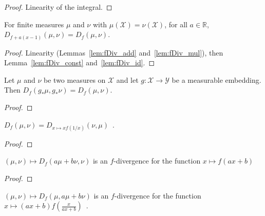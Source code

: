 \begin{proof}\leanok
Linearity of the integral.
\end{proof}


\begin{lemma}
  \label{lem:fDiv_add_linear}
  \leanok
  For finite measures $\mu$ and $\nu$ with $\mu(\mathcal X) = \nu(\mathcal X)$, for all $a \in \mathbb{R}$, $D_{f + a(x - 1)}(\mu, \nu) = D_{f}(\mu, \nu)$.
\end{lemma}

\begin{proof}\leanok
{}
Linearity (Lemmas~\ref{lem:fDiv_add} and~\ref{lem:fDiv_mul}), then Lemma~\ref{lem:fDiv_const} and~\ref{lem:fDiv_id}.
\end{proof}


\begin{lemma}
  \label{lem:fDiv_map_measurableEmbedding}
  \leanok
  Let $\mu$ and $\nu$ be two measures on $\mathcal X$ and let $g : \mathcal X \to \mathcal Y$ be a measurable embedding. Then $D_f(g_* \mu, g_* \nu) = D_f(\mu, \nu)$.
\end{lemma}

\begin{proof}\leanok
\end{proof}


\begin{lemma}
  \label{lem:fDiv_symm}
  $D_f(\mu, \nu) = D_{x \mapsto xf(1/x)}(\nu, \mu)$~.
\end{lemma}

\begin{proof}%
\uses{}

\end{proof}


\begin{lemma}
  \label{lem:fDiv_add_smul_left}
  $(\mu, \nu) \mapsto D_f(a \mu + b \nu, \nu)$ is an $f$-divergence for the function $x \mapsto f(ax + b)$
\end{lemma}

\begin{proof}%
\uses{}
\end{proof}


\begin{lemma}
  \label{lem:fDiv_add_smul_right}
  $(\mu, \nu) \mapsto D_f(\mu, a \mu + b \nu)$ is an $f$-divergence for the function $x \mapsto (ax+b)f\left(\frac{x}{ax+b}\right)$~.
\end{lemma}

